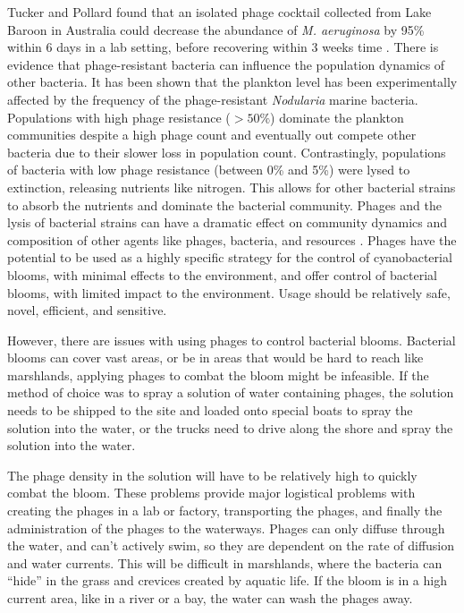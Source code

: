 Tucker and Pollard found that an isolated phage cocktail collected from Lake Baroon in Australia could decrease the abundance of \textit{M. aeruginosa} by 95\% within 6 days in a lab setting, before recovering within 3 weeks time \cite{tuckerIdentificationCyanophageMaLBP2005}. \newline
There is evidence that phage-resistant bacteria can influence the population dynamics of other bacteria.
It has been shown that the plankton level has been experimentally affected by the frequency of the phage-resistant \textit{Nodularia} marine bacteria.
Populations with high phage resistance ($>50\%$) dominate the plankton communities despite a high phage count and eventually out compete other bacteria due to their slower loss in population count.
Contrastingly, populations of bacteria with low phage resistance (between 0\% and 5\%) were lysed to extinction, releasing nutrients like nitrogen.
This allows for other bacterial strains to absorb the nutrients and dominate the bacterial community.
Phages and the lysis of bacterial strains can have a dramatic effect on community dynamics and composition of other agents like phages, bacteria, and resources \cite{colomaFrequencyVirusresistantHosts2019}.
Phages have the potential to be used as a highly specific strategy for the control of cyanobacterial blooms, with minimal effects to the environment, and offer control of bacterial blooms, with limited impact to the environment.
Usage should be relatively safe, novel, efficient, and sensitive. \newline 

However, there are issues with using phages to control bacterial blooms.
Bacterial blooms can cover vast areas, or be in areas that would be hard to reach like marshlands, applying phages to combat the bloom might be infeasible.
If the method of choice was to spray a solution of water containing phages, the solution needs to be shipped to the site and loaded onto special boats to spray the solution into the water, or the trucks need to drive along the shore and spray the solution into the water.

The phage density in the solution will have to be relatively high to quickly combat the bloom.
These problems provide major logistical problems with creating the phages in a lab or factory, transporting the phages, and finally the administration of the phages to the waterways.
Phages can only diffuse through the water, and can't actively swim, so they are dependent on the rate of diffusion and water currents.
This will be difficult in marshlands, where the bacteria can “hide” in the grass and crevices created by aquatic life.
If the bloom is in a high current area, like in a river or a bay, the water can wash the phages away.

